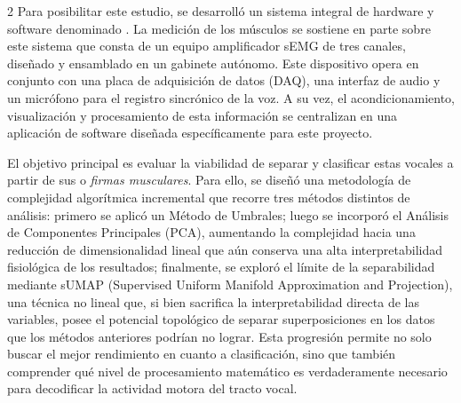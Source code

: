 \documentclass[11pt, letterpaper]{article}
\begin{document}
\begin{multicols*}{2}
Para posibilitar este estudio, se desarrolló un sistema integral de hardware y software denominado . La medición de los músculos se sostiene en parte sobre este sistema que consta de un equipo amplificador sEMG de tres canales, diseñado y ensamblado en un gabinete autónomo. Este dispositivo opera en conjunto con una placa de adquisición de datos (DAQ), una interfaz de audio y un micrófono para el registro sincrónico de la voz. A su vez, el acondicionamiento, visualización y procesamiento de esta información se centralizan en una aplicación de software diseñada específicamente para este proyecto.

El objetivo principal es evaluar la viabilidad de separar y clasificar estas vocales a partir de sus  o \textit{firmas musculares}. Para ello, se diseñó una metodología de complejidad algorítmica incremental que recorre tres métodos distintos de análisis: primero se aplicó un Método de Umbrales; luego se incorporó el Análisis de Componentes Principales (PCA), aumentando la complejidad hacia una reducción de dimensionalidad lineal que aún conserva una alta interpretabilidad fisiológica de los resultados; finalmente, se exploró el límite de la separabilidad mediante sUMAP (Supervised Uniform Manifold Approximation and Projection), una técnica no lineal que, si bien sacrifica la interpretabilidad directa de las variables, posee el potencial topológico de separar superposiciones en los datos que los métodos anteriores podrían no lograr. Esta progresión permite no solo buscar el mejor rendimiento en cuanto a clasificación, sino que también comprender qué nivel de procesamiento matemático es verdaderamente necesario para decodificar la actividad motora del tracto vocal.


\end{multicols*}
\end{document}
